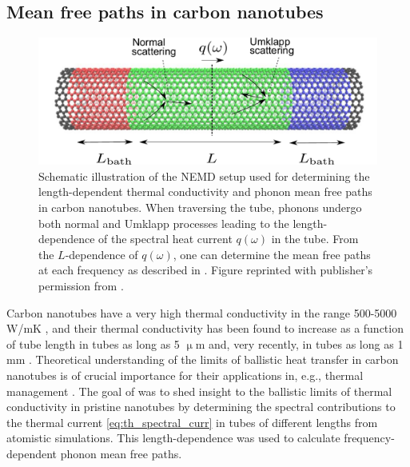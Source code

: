 \subsection{Mean free paths in carbon nanotubes}

\label{sec:results_mfps}

\begin{figure}[tb]
 \begin{center}
  \includegraphics[width=.89\columnwidth]{pics/cnt_fig1-crop.pdf} 
  \caption{Schematic illustration of the NEMD setup used for determining the length-dependent thermal conductivity and phonon mean free paths in carbon nanotubes. When traversing the tube, phonons undergo both normal and Umklapp processes leading to the length-dependence of the spectral heat current $q(\omega)$ in the tube. From the $L$-dependence of $q(\omega)$, one can determine the mean free paths at each frequency as described in . Figure reprinted with publisher's permission from .}  
\label{fig:cnt_fig1}
 \end{center}
\end{figure}

Carbon nanotubes have a very high thermal conductivity in the range 500-5000 W/mK \cite{marconnet13}, and their thermal conductivity has been found to increase as a function of tube length in tubes as long as 5 $\upmu$m \cite{chang08} and, very recently, in tubes as long as 1 mm \cite{chang_personal}. Theoretical understanding of the limits of ballistic heat transfer in carbon nanotubes is of crucial importance for their applications in, e.g., thermal management \cite{biercuk02,huang05}. The goal of  was to shed insight to the ballistic limits of thermal conductivity in pristine nanotubes by determining the spectral contributions to the thermal current \eqref{eq:th_spectral_curr} in tubes of different lengths from atomistic simulations. This length-dependence was used to calculate frequency-dependent phonon mean free paths. %

